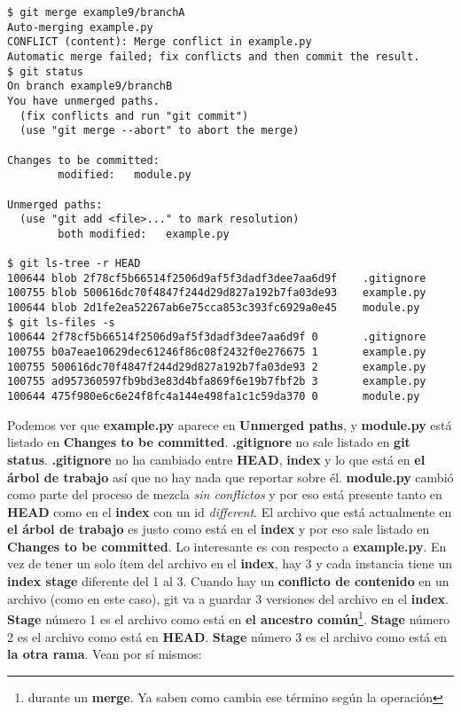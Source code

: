 \begin{lstlisting}[style=console_style,
	basicstyle=\small,
	caption=Mezclando]
$ git merge example9/branchA
Auto-merging example.py
CONFLICT (content): Merge conflict in example.py
Automatic merge failed; fix conflicts and then commit the result.
$ git status
On branch example9/branchB
You have unmerged paths.
  (fix conflicts and run "git commit")
  (use "git merge --abort" to abort the merge)

Changes to be committed:
        modified:   module.py

Unmerged paths:
  (use "git add <file>..." to mark resolution)
        both modified:   example.py

$ git ls-tree -r HEAD
100644 blob 2f78cf5b66514f2506d9af5f3dadf3dee7aa6d9f    .gitignore
100755 blob 500616dc70f4847f244d29d827a192b7fa03de93    example.py
100644 blob 2d1fe2ea52267ab6e75cca853c393fc6929a0e45    module.py
$ git ls-files -s
100644 2f78cf5b66514f2506d9af5f3dadf3dee7aa6d9f 0       .gitignore
100755 b0a7eae10629dec61246f86c08f2432f0e276675 1       example.py
100755 500616dc70f4847f244d29d827a192b7fa03de93 2       example.py
100755 ad957360597fb9bd3e83d4bfa869f6e19b7fbf2b 3       example.py
100644 475f980e6c6e24f8fc4a144e498fa1c1c59da370 0       module.py
\end{lstlisting}

Podemos ver que {\bf example.py} aparece en {\bf Unmerged paths}, y {\bf module.py} está listado en {\bf Changes to be committed}.
{\bf .gitignore} no sale listado en {\bf git status}. {\bf .gitignore} no ha cambiado entre {\bf HEAD}, {\bf index} y lo que
está en {\bf el árbol de trabajo} así que no hay nada que reportar sobre él. {\bf module.py} cambió como parte del proceso de
mezcla {\it sin conflictos} y por eso está presente tanto en {\bf HEAD} como en el {\bf index} con un id {\it different}. El archivo
que está actualmente en {\bf el árbol de trabajo} es justo como está en el {\bf index} y por eso sale listado en 
{\bf Changes to be committed}. Lo interesante es con respecto a {\bf example.py}. En vez de tener un solo ítem del archivo
en el {\bf index}, hay 3 y cada instancia tiene un {\bf index stage } diferente del 1 al 3. Cuando hay un {\bf conflicto de contenido}
en un archivo (como en este caso), git va a guardar 3 versiones del archivo en el {\bf index}. {\bf Stage } número 1 es el archivo
como está en {\bf el ancestro común}\footnote{durante un {\bf merge}. Ya saben como cambia ese término según la operación}.
{\bf Stage} número 2 es el archivo como está en {\bf HEAD}. {\bf Stage} número 3 es el archivo como está en {\bf la otra rama}.
Vean por sí mismos:

